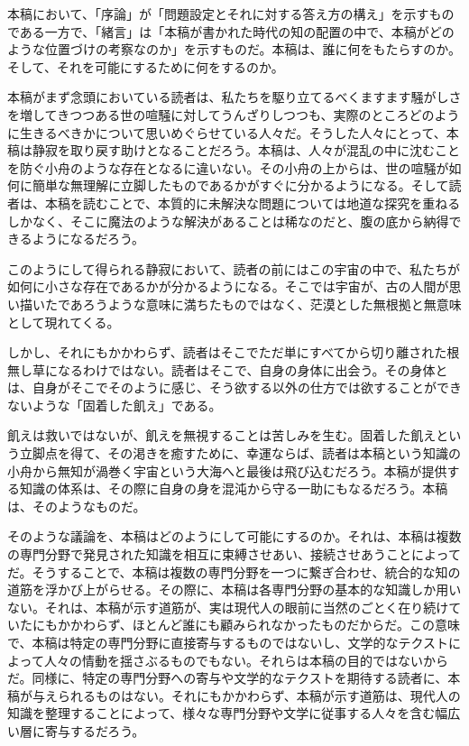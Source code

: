 本稿において、「序論」が「問題設定とそれに対する答え方の構え」を示すものである一方で、「緒言」は「本稿が書かれた時代の知の配置の中で、本稿がどのような位置づけの考察なのか」を示すものだ。本稿は、誰に何をもたらすのか。そして、それを可能にするために何をするのか。

本稿がまず念頭においている読者は、私たちを駆り立てるべくますます騒がしさを増してきつつある世の喧騒に対してうんざりしつつも、実際のところどのように生きるべきかについて思いめぐらせている人々だ。そうした人々にとって、本稿は静寂を取り戻す助けとなることだろう。本稿は、人々が混乱の中に沈むことを防ぐ小舟のような存在となるに違いない。その小舟の上からは、世の喧騒が如何に簡単な無理解に立脚したものであるかがすぐに分かるようになる。そして読者は、本稿を読むことで、本質的に未解決な問題については地道な探究を重ねるしかなく、そこに魔法のような解決があることは稀なのだと、腹の底から納得できるようになるだろう。

このようにして得られる静寂において、読者の前にはこの宇宙の中で、私たちが如何に小さな存在であるかが分かるようになる。そこでは宇宙が、古の人間が思い描いたであろうような意味に満ちたものではなく、茫漠とした無根拠と無意味として現れてくる。

しかし、それにもかかわらず、読者はそこでただ単にすべてから切り離された根無し草になるわけではない。読者はそこで、自身の身体に出会う。その身体とは、自身がそこでそのように感じ、そう欲する以外の仕方では欲することができないような「固着した飢え」である。

飢えは救いではないが、飢えを無視することは苦しみを生む。固着した飢えという立脚点を得て、その渇きを癒すために、幸運ならば、読者は本稿という知識の小舟から無知が渦巻く宇宙という大海へと最後は飛び込むだろう。本稿が提供する知識の体系は、その際に自身の身を混沌から守る一助にもなるだろう。本稿は、そのようなものだ。

そのような議論を、本稿はどのようにして可能にするのか。それは、本稿は複数の専門分野で発見された知識を相互に束縛させあい、接続させあうことによってだ。そうすることで、本稿は複数の専門分野を一つに繋ぎ合わせ、統合的な知の道筋を浮かび上がらせる。その際に、本稿は各専門分野の基本的な知識しか用いない。それは、本稿が示す道筋が、実は現代人の眼前に当然のごとく在り続けていたにもかかわらず、ほとんど誰にも顧みられなかったものだからだ。この意味で、本稿は特定の専門分野に直接寄与するものではないし、文学的なテクストによって人々の情動を揺さぶるものでもない。それらは本稿の目的ではないからだ。同様に、特定の専門分野への寄与や文学的なテクストを期待する読者に、本稿が与えられるものはない。それにもかかわらず、本稿が示す道筋は、現代人の知識を整理することによって、様々な専門分野や文学に従事する人々を含む幅広い層に寄与するだろう。
